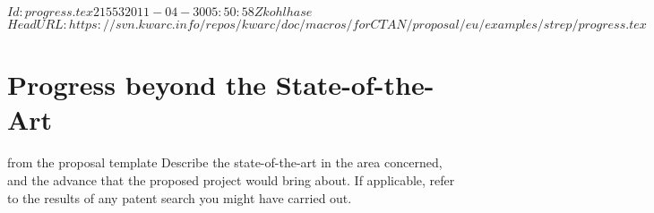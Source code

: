 \svnInfo $Id: progress.tex 21553 2011-04-30 05:50:58Z kohlhase $
\svnKeyword $HeadURL: https://svn.kwarc.info/repos/kwarc/doc/macros/forCTAN/proposal/eu/examples/strep/progress.tex $
\section{Progress beyond the State-of-the-Art}\label{sec:progress}
\begin{todo}{from the proposal template}
 Describe the state-of-the-art in the area concerned, and the advance that the proposed
  project would bring about. If applicable, refer to the results of any patent search you
  might have carried out.
\end{todo}

